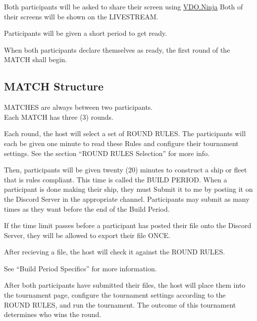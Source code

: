 \documentclass[11pt]{article}
\newcommand{\termemph}[1]{\uppercase{#1}}
\begin{document}
Both participants will be asked to share their screen using \href{https://vdo.ninja/}{VDO.Ninja}
Both of their screens will be shown on the \termemph{Livestream}.

Participants will be given a short period to get ready. 

When both participants declare themselves as ready, the first round of the \termemph{match} shall begin.

\subsection{\termemph{match} Structure}
\termemph{matches} are always between two participants.\\
Each \termemph{match} has three (3) rounds.

Each round, the host will select a set of \termemph{Round Rules}. The participants will each be given 
one minute to read these Rules and configure their tournament settings. See the section 
``\termemph{Round Rules} Selection'' for more info.

Then, participants will be given twenty (20) minutes to construct a ship or fleet that is rules
compliant.
This time is called the \termemph{Build Period}.
When a participant is done making their ship, they must Submit it to me by posting it on the 
Discord Server in the appropriate channel. Participants may submit as many times as they want
before the end of the Build Period.

If the time limit passes before a participant has posted their file onto the Discord Server, they 
will be allowed to export their file ONCE.

After recieving a file, the host will check it against the \termemph{Round Rules}.

See ``Build Period Specifics'' for more information.

After both participants have submitted their files, the host will place them into the tournament 
page, configure the tournament settings according to the \termemph{Round Rules}, and run the tournament. The 
outcome of this tournament determines who wins the round.
\end{document}

